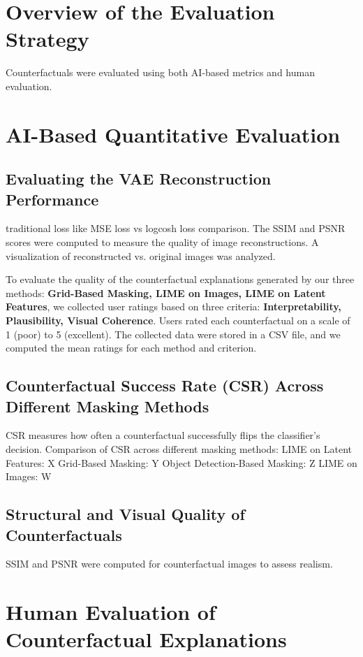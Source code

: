 \section{Overview of the Evaluation Strategy}
Counterfactuals were evaluated using both AI-based metrics and human evaluation.

\section{AI-Based Quantitative Evaluation}

\subsection{Evaluating the VAE Reconstruction Performance}
traditional loss like MSE loss vs logcosh loss comparison.
The SSIM and PSNR scores were computed to measure the quality of image reconstructions.
A visualization of reconstructed vs. original images was analyzed.

To evaluate the quality of the counterfactual explanations generated by our three methods: 
\textbf{Grid-Based Masking, LIME on Images, LIME on Latent Features}, we collected user ratings based on three criteria: 
\textbf{Interpretability, Plausibility, Visual Coherence}. Users rated each counterfactual on a scale of 1 (poor) to 5 (excellent). 
The collected data were stored in a CSV file, and we computed the mean ratings for each method and criterion.


\subsection{Counterfactual Success Rate (CSR) Across Different Masking Methods}
CSR measures how often a counterfactual successfully flips the classifier’s decision.
Comparison of CSR across different masking methods:
LIME on Latent Features: X%
Grid-Based Masking: Y%
Object Detection-Based Masking: Z%
LIME on Images: W%


\subsection{Structural and Visual Quality of Counterfactuals}
SSIM and PSNR were computed for counterfactual images to assess realism.






\section{Human Evaluation of Counterfactual Explanations} \label{section:Human Evaluation of Counterfactual Explanations}

